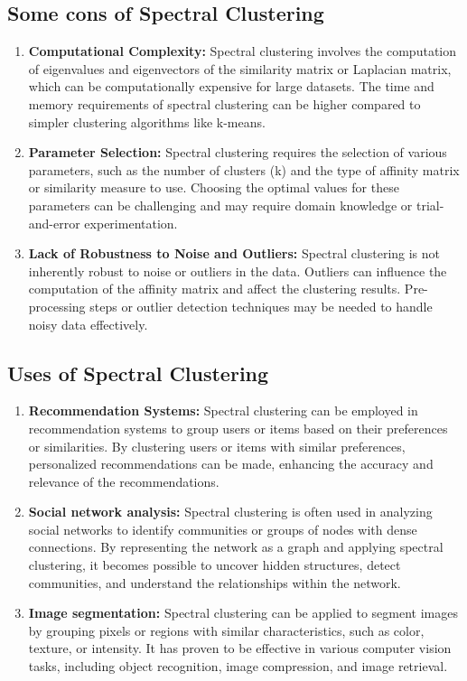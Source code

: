 \documentclass{article}
\begin{document}
    \subsection{Some cons of Spectral Clustering}
        \begin{enumerate}
            \item \textbf{Computational Complexity: }Spectral clustering involves the computation of eigenvalues and eigenvectors of the similarity matrix or Laplacian matrix, which can be computationally expensive for large datasets. The time and memory requirements of spectral clustering can be higher compared to simpler clustering algorithms like k-means.
            \item \textbf{Parameter Selection: }Spectral clustering requires the selection of various parameters, such as the number of clusters (k) and the type of affinity matrix or similarity measure to use. Choosing the optimal values for these parameters can be challenging and may require domain knowledge or trial-and-error experimentation.
            \item \textbf{Lack of Robustness to Noise and Outliers: }Spectral clustering is not inherently robust to noise or outliers in the data. Outliers can influence the computation of the affinity matrix and affect the clustering results. Pre-processing steps or outlier detection techniques may be needed to handle noisy data effectively.
        \end{enumerate}

    \subsection{Uses of Spectral Clustering}
        \begin{enumerate}
            \item \textbf{Recommendation Systems: }Spectral clustering can be employed in recommendation systems to group users or items based on their preferences or similarities. By clustering users or items with similar preferences, personalized recommendations can be made, enhancing the accuracy and relevance of the recommendations.
            \item \textbf{Social network analysis: }Spectral clustering is often used in analyzing social networks to identify communities or groups of nodes with dense connections. By representing the network as a graph and applying spectral clustering, it becomes possible to uncover hidden structures, detect communities, and understand the relationships within the network.
            \item \textbf{Image segmentation: }Spectral clustering can be applied to segment images by grouping pixels or regions with similar characteristics, such as color, texture, or intensity. It has proven to be effective in various computer vision tasks, including object recognition, image compression, and image retrieval.
        \end{enumerate}
\end{document}
